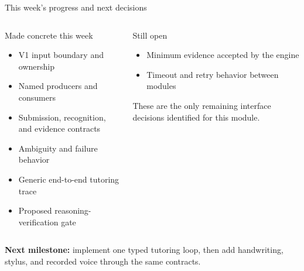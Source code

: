 \documentclass[aspectratio=169,10pt]{beamer}
\begin{document}
\begin{frame}{This week's progress and next decisions}
\begin{columns}[T,onlytextwidth]
\begin{block}{Made concrete this week}
\begin{itemize}
\item V1 input boundary and ownership
\item Named producers and consumers
\item Submission, recognition, and evidence contracts
\item Ambiguity and failure behavior
\item Generic end-to-end tutoring trace
\item Proposed reasoning-verification gate
\end{itemize}
\end{block}
\begin{block}{Still open}
\begin{itemize}
\item Minimum evidence accepted by the engine
\item Timeout and retry behavior between modules
\end{itemize}
\vspace{.35em}
These are the only remaining interface decisions identified for this module.
\end{block}
\end{columns}
\vspace{.35em}
\centering
\textbf{Next milestone:} implement one typed tutoring loop, then add handwriting, stylus, and recorded voice through the same contracts.
\end{frame}
\end{document}
